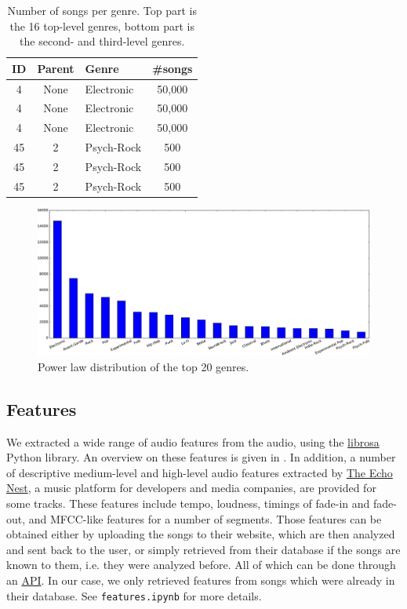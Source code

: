 \documentclass{article}
\begin{document}
\begin{table}
	\centering
	\begin{tabular}{cclc}
		\toprule
		ID & Parent & Genre & \#songs \\
		\midrule
		4 & None & Electronic & 50,000 \\
		4 & None & Electronic & 50,000 \\
		4 & None & Electronic & 50,000 \\
		\midrule
		45 & 2 & Psych-Rock & 500 \\
		45 & 2 & Psych-Rock & 500 \\
		45 & 2 & Psych-Rock & 500 \\
		\bottomrule
	\end{tabular}
	\caption{Number of songs per genre. Top part is the 16 top-level genres, bottom part is the second- and third-level genres.}
	\label{tab:genres}
\end{table}

\begin{figure}
	\centering
	\includegraphics[width=\linewidth]{histo_large.pdf}
	\caption{Power law distribution of the top 20 genres.}
	\label{fig:genres}
\end{figure}

\subsection{Features} %

We extracted a wide range of audio features from the audio, using the \href{https://github.com/librosa/librosa}{librosa} Python library. An overview
on these features is given in .
In addition, a number of descriptive medium-level and high-level audio features extracted by \href{http://the.echonest.com/}{The Echo Nest}, a music platform for developers and media companies, are provided for some tracks. These features include tempo, loudness, timings of fade-in and fade-out, and MFCC-like features for a number of segments.
Those features can be obtained either by uploading the songs to their website, which are then analyzed and sent back to the user, or simply retrieved from their database if the songs are known to them, i.e. they were analyzed before. All of which can be done through an \href{http://developer.echonest.com}{API}. In our case, we only retrieved features from songs which were already in their database.
See \texttt{features.ipynb} for more details.
\end{document}

